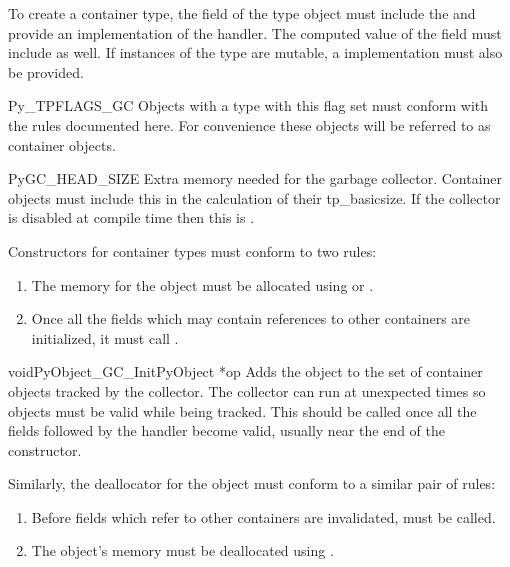 \documentclass{manual}
\begin{document}
To create a container type, the  field of the type
object must include the  and provide an
implementation of the  handler.  The computed
value of the  field must include
 as well.  If instances of the type are
mutable, a  implementation must also be provided.

\begin{datadesc}{Py_TPFLAGS_GC}
  Objects with a type with this flag set must conform with the rules
  documented here.  For convenience these objects will be referred to
  as container objects.
\end{datadesc}

\begin{datadesc}{PyGC_HEAD_SIZE}
  Extra memory needed for the garbage collector.  Container objects
  must include this in the calculation of their tp_basicsize.  If the
  collector is disabled at compile time then this is .
\end{datadesc}

Constructors for container types must conform to two rules:

\begin{enumerate}
\item  The memory for the object must be allocated using
        or .

\item  Once all the fields which may contain references to other
       containers are initialized, it must call
       .
\end{enumerate}

\begin{cfuncdesc}{void}{PyObject_GC_Init}{PyObject *op}
  Adds the object  to the set of container objects tracked by
  the collector.  The collector can run at unexpected times so objects
  must be valid while being tracked.  This should be called once all
  the fields followed by the  handler become valid,
  usually near the end of the constructor.
\end{cfuncdesc}

Similarly, the deallocator for the object must conform to a similar
pair of rules:

\begin{enumerate}
\item  Before fields which refer to other containers are invalidated,
        must be called.

\item  The object's memory must be deallocated using
       .
\end{enumerate}
\end{document}

